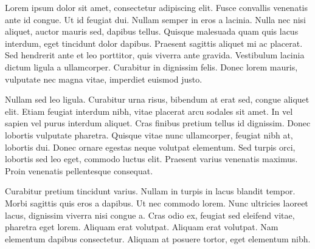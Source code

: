 Lorem ipsum dolor sit amet, consectetur adipiscing elit. Fusce convallis venenatis ante id congue. Ut id feugiat dui. Nullam semper in eros a lacinia. Nulla nec nisi aliquet, auctor mauris sed, dapibus tellus. Quisque malesuada quam quis lacus interdum, eget tincidunt dolor dapibus. Praesent sagittis aliquet mi ac placerat. Sed hendrerit ante et leo porttitor, quis viverra ante gravida. Vestibulum lacinia dictum ligula a ullamcorper. Curabitur in dignissim felis. Donec lorem mauris, vulputate nec magna vitae, imperdiet euismod justo.

Nullam sed leo ligula. Curabitur urna risus, bibendum at erat sed, congue aliquet elit. Etiam feugiat interdum nibh, vitae placerat arcu sodales sit amet. In vel sapien vel purus interdum aliquet. Cras finibus pretium tellus id dignissim. Donec lobortis vulputate pharetra. Quisque vitae nunc ullamcorper, feugiat nibh at, lobortis dui. Donec ornare egestas neque volutpat elementum. Sed turpis orci, lobortis sed leo eget, commodo luctus elit. Praesent varius venenatis maximus. Proin venenatis pellentesque consequat.

Curabitur pretium tincidunt varius. Nullam in turpis in lacus blandit tempor. Morbi sagittis quis eros a dapibus. Ut nec commodo lorem. Nunc ultricies laoreet lacus, dignissim viverra nisi congue a. Cras odio ex, feugiat sed eleifend vitae, pharetra eget lorem. Aliquam erat volutpat. Aliquam erat volutpat. Nam elementum dapibus consectetur. Aliquam at posuere tortor, eget elementum nibh.
